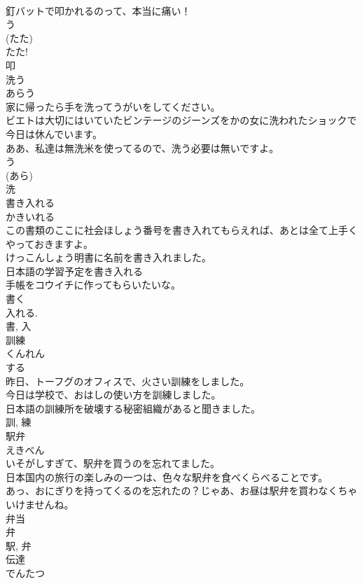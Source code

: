 \documentclass[8pt]{extreport}
\begin{document}
\begin{CJK}{UTF8}{min}
\\	釘バットで叩かれるのって、本当に痛い！	
\\	う 
\\	(たた) 
\\	たた! 
\\	叩	
\\	洗う	
\\	あらう	
\\	家に帰ったら手を洗ってうがいをしてください。	
\\	ビエトは大切にはいていたビンテージのジーンズをかの女に洗われたショックで今日は休んでいます。	
\\	ああ、私達は無洗米を使ってるので、洗う必要は無いですよ。	
\\	う 
\\	(あら) 
\\	洗	
\\	書き入れる	
\\	かきいれる	
\\	この書類のここに社会ほしょう番号を書き入れてもらえれば、あとは全て上手くやっておきますよ。	
\\	けっこんしょう明書に名前を書き入れました。	
\\	日本語の学習予定を書き入れる
\\	手帳をコウイチに作ってもらいたいな。	
\\	書く 
\\	入れる. 
\\	書, 入	
\\	訓練	
\\	くんれん	
\\	する 
\\	昨日、トーフグのオフィスで、火さい訓練をしました。	
\\	今日は学校で、おはしの使い方を訓練しました。	
\\	日本語の訓練所を破壊する秘密組織があると聞きました。	
\\	訓, 練	
\\	駅弁	
\\	えきべん	
\\	いそがしすぎて、駅弁を買うのを忘れてました。	
\\	日本国内の旅行の楽しみの一つは、色々な駅弁を食べくらべることです。	
\\	あっ、おにぎりを持ってくるのを忘れたの？じゃあ、お昼は駅弁を買わなくちゃいけませんね。	
\\	弁当 
\\	弁 
\\	駅, 弁	
\\	伝達	
\\	でんたつ	

\end{CJK}
\end{document}
